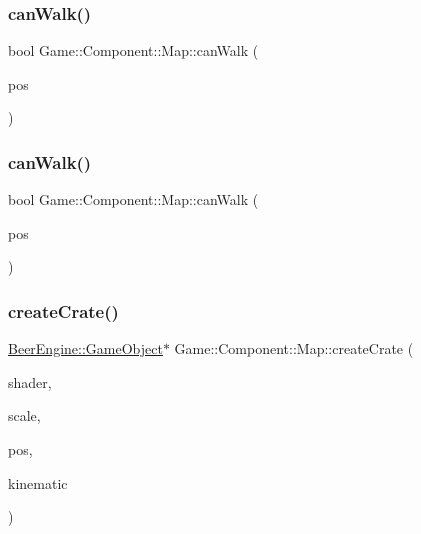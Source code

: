 \mbox{\label{class_game_1_1_component_1_1_map_a58dde006ce5b554a6ac63dc59bb480e1}} 
\subsubsection{\texorpdfstring{can\+Walk()}{canWalk()}\hspace{0.1cm}{\footnotesize\ttfamily [1/2]}}
{\footnotesize\ttfamily bool Game\+::\+Component\+::\+Map\+::can\+Walk (\begin{DoxyParamCaption}\item[{glm\+::vec2}]{pos }\end{DoxyParamCaption})}

\mbox{\label{class_game_1_1_component_1_1_map_a7a6621502aa66db7afdb6c63494c6790}} 
\subsubsection{\texorpdfstring{can\+Walk()}{canWalk()}\hspace{0.1cm}{\footnotesize\ttfamily [2/2]}}
{\footnotesize\ttfamily bool Game\+::\+Component\+::\+Map\+::can\+Walk (\begin{DoxyParamCaption}\item[{glm\+::vec3}]{pos }\end{DoxyParamCaption})}

\mbox{\label{class_game_1_1_component_1_1_map_a9630a4fd7c1ba8e2d463bb4f8f1ce4e9}} 
\subsubsection{\texorpdfstring{create\+Crate()}{createCrate()}}
{\footnotesize\ttfamily \mbox{\hyperlink{class_beer_engine_1_1_game_object}{Beer\+Engine\+::\+Game\+Object}}$\ast$ Game\+::\+Component\+::\+Map\+::create\+Crate (\begin{DoxyParamCaption}\item[{\mbox{\hyperlink{class_beer_engine_1_1_graphics_1_1_shader_program}{Beer\+Engine\+::\+Graphics\+::\+Shader\+Program}} $\ast$}]{shader,  }\item[{glm\+::vec3}]{scale,  }\item[{glm\+::vec3}]{pos,  }\item[{\mbox{\hyperlink{namespace_beer_engine_1_1_component_a2cfe279cc309b6420e792597940b8a33}{Beer\+Engine\+::\+Component\+::\+R\+B\+Type}}}]{kinematic }\end{DoxyParamCaption})}

